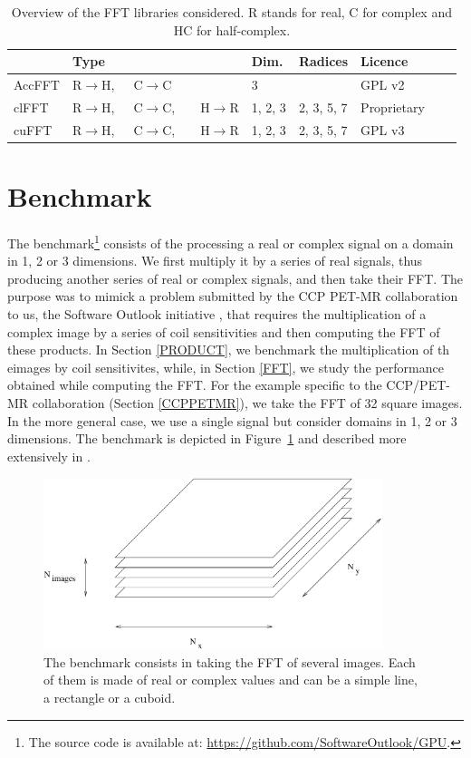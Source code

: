 \documentclass[12pt, a4paper]{article}
\begin{document}
\begin{table}[H]
\captionsetup{width=0.8\textwidth}
\centering
\begin{tabular}{|p{2.5cm}||p{2.5cm}|p{1cm}|p{3cm}|p{3cm}|p{2cm}|p{2cm}|}
\hline
& Type & Dim. & Radices & Licence \\
\hline
\hline
AccFFT & R$\to$H,\ \ \  C$\to$C& 3& & GPL v2\\
\hline
clFFT  &  R$\to$H,\ \ \  C$\to$C,\ \ \ \  H$\to$R& 1, 2, 3 & 2, 3, 5, 7 & Proprietary\\
\hline
cuFFT  &  R$\to$H,\ \ \  C$\to$C,\ \ \ \  H$\to$R & 1, 2, 3 & 2, 3, 5, 7 & GPL v3\\
\hline
\end{tabular}
\caption{Overview of the FFT libraries considered. R stands for real, C for complex and HC for half-complex.}
\label{ffttable}
\end{table}

\section{Benchmark}
The benchmark\footnote{The source code is available at:
  \hyperlink{https://github.com/SoftwareOutlook/GPU}{https://github.com/SoftwareOutlook/GPU}.}
consists of the processing a real or complex signal on a domain in 1,
2 or 3 dimensions. We first multiply it by a series of real signals,
thus producing another series of real or complex signals, and then
take their FFT.  The purpose was to mimick a problem submitted by the
CCP PET-MR collaboration \cite{ccppetmr} to us, the Software Outlook
initiative \cite{softwareoutlook}, that requires the multiplication of
a complex image by a series of coil sensitivities and then computing
the FFT of these products. In Section \ref{PRODUCT}, we benchmark the
multiplication of th eimages by coil sensitivites, while, in Section
\ref{FFT}, we study the performance obtained while computing the
FFT. For the example specific to the CCP/PET-MR collaboration (Section
\ref{CCPPETMR}), we take the FFT of 32 square images. In the more
general case, we use a single signal but consider domains in 1, 2 or 3
dimensions. The benchmark is depicted in Figure~\ref{benchmark} and
described more extensively in \cite{FFTREPORT}.

\begin{figure}[htb]
\captionsetup{width=0.6\textwidth}
\centering
\includegraphics[height=5cm]{benchmark.pdf}
\caption{The benchmark consists in taking the FFT of several images. Each of them is made of real or complex values and can be a simple line, a rectangle or a cuboid.}
\label{benchmark}
\end{figure}
\end{document}
